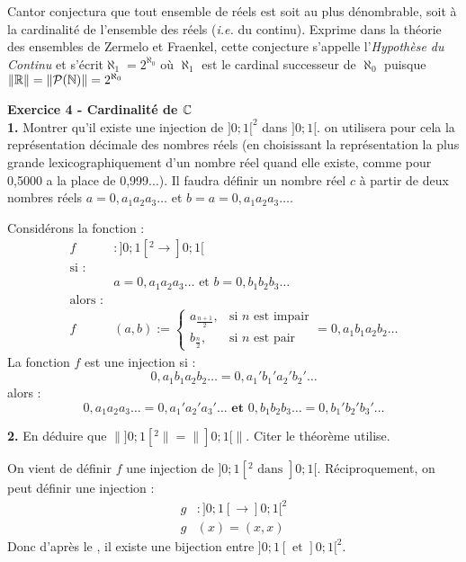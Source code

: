     Cantor conjectura que tout ensemble de réels est soit au plus dénombrable, soit à la cardinalité de l'ensemble des réels (\emph{i.e.} du continu). Exprime dans la théorie des ensembles de Zermelo et Fraenkel, cette conjecture s'appelle l'\emph{Hypothèse du Continu} et s'écrit\(\aleph_1=2^{\aleph_0}\) o\`u \(\aleph_1\) est le cardinal successeur de \(\aleph_0\) puisque \(\|\mathbb{R}\|=\|\mathcal{P}(\mathbb{N})\|=2^{\aleph_0}\)\par

    \hspace*{-2.65cm}\textbf{Exercice 4 - Cardinalité de \(\mathbb{C}\)}\\
    \hspace*{-1.5em}\textbf{1.} Montrer qu'il existe une injection de \(]0;1[^2\) dans \(]0;1[\). on utilisera pour cela la représentation décimale des nombres réels (en choisissant la représentation la plus grande lexicographiquement d'un nombre réel quand elle existe, comme pour 0,5000 a la place de 0,999...). Il faudra définir un nombre réel \(c\) à partir de deux nombres réels \(a=0,a_1a_2a_3\dots\) et \(b=a=0,a_1a_2a_3\dots\).\par
    \headrule
    Considérons la fonction :
    \begin{equation}
    \begin{split}
        f&\colon]0;1[^2\rightarrow]0;1[\\
        \text{si :}&\\
        &a=0,a_1a_2a_3\dots \text{ et } b=0,b_1b_2b_3\dots\\
        \text{alors :}&\\
        f&(a,b) := 
        \begin{cases} 
        a_{\frac{n+1}{2}}, & \text{si } n \text{ est impair} \\
        b_{\frac{n}{2}}, & \text{si } n \text{ est pair}
        \end{cases}
        = 0,a_1b_1a_2b_2\dots
    \end{split}
    \end{equation}
    La fonction \(f\) est une injection si :
    \begin{equation}
        0,a_1b_1a_2b_2\dots = 0,a_1'b_1'a_2'b_2'\dots
    \end{equation}
    alors :
    \begin{equation}
        0,a_1a_2a_3\dots=0,a_1'a_2'a_3'\dots\textbf{ et }0,b_1b_2b_3\dots=0,b_1'b_2'b_3'\dots
    \end{equation}

    \hspace*{-1.5em}\textbf{2.} En déduire que \(\|]0;1[^2\|=\|]0;1[\|\). Citer le théorème utilise.\par
    \headrule
    On vient de définir \(f\) une injection de \(]0;1[^2\text{ dans }]0;1[\). Réciproquement, on peut définir une injection :
    \begin{equation}
    \begin{split}
        g&\colon]0;1[\rightarrow]0;1[^2\\
        g&(x)=(x,x)
    \end{split}
    \end{equation}
    Donc d'après le , il existe une bijection entre \(]0;1[\text{ et }]0;1[^2\).

